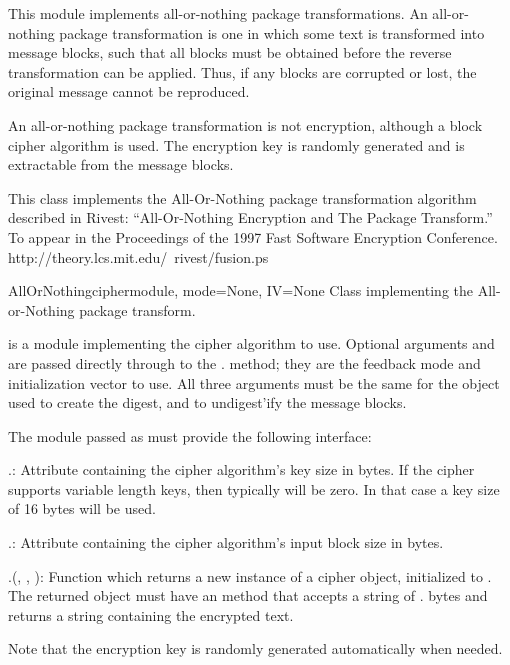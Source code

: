\documentclass{howto}
\begin{document}
This module implements all-or-nothing package transformations.
An all-or-nothing package transformation is one in which some text is
transformed into message blocks, such that all blocks must be obtained before
the reverse transformation can be applied.  Thus, if any blocks are corrupted
or lost, the original message cannot be reproduced.

An all-or-nothing package transformation is not encryption, although a block
cipher algorithm is used.  The encryption key is randomly generated and is
extractable from the message blocks.

This class implements the All-Or-Nothing package transformation
algorithm described in Rivest: ``All-Or-Nothing Encryption and The
Package Transform.''  To appear in the Proceedings of the 1997 Fast
Software Encryption Conference.
http://theory.lcs.mit.edu/~rivest/fusion.ps

\begin{classdesc}{AllOrNothing}{ciphermodule, mode=None, IV=None}
Class implementing the All-or-Nothing package transform.

 is a module implementing the cipher algorithm to
use.  Optional arguments  and  are passed directly
through to the . method; they are the
feedback mode and initialization vector to use.  All three arguments
must be the same for the object used to create the digest, and to
undigest'ify the message blocks.

The module passed as  must provide the
following interface:

.: 
Attribute containing the cipher algorithm's key size in
bytes.  If the cipher supports variable length keys, then
typically  will be zero.  In that case a
key size of 16 bytes will be used.

.: 
Attribute containing the cipher algorithm's input block size
in bytes.

.(, , ):
                Function which returns a new instance of a cipher object,
                initialized to .  The returned object must have an
                 method that accepts a string of
                . bytes and returns a string containing
                the encrypted text.

Note that the encryption key is randomly generated automatically
when needed.  
\end{classdesc}
\end{document}
